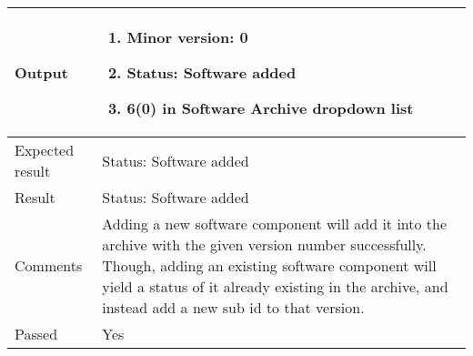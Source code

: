 \begin{table}[H]
\begin{tabularx}{1.0\textwidth}{
    |p{}     %
    |p{}|    %
}
Output
& \begin{enumerate}
    \item Minor version: 0
    \item Status: Software added
    \item 6(0) in Software Archive dropdown list
\end{enumerate}
\\
\hline

Expected result
& Status: Software added
\\
\hline

Result
& Status: Software added
\\
\hline

Comments
& Adding a new software component will add it into the archive with the given version number successfully. Though, adding an existing software component will yield a status of it already existing in the archive, and instead add a new sub id to that version.
\\
\hline

Passed
& Yes
\\
\hline

\end{tabularx}
\end{table}

